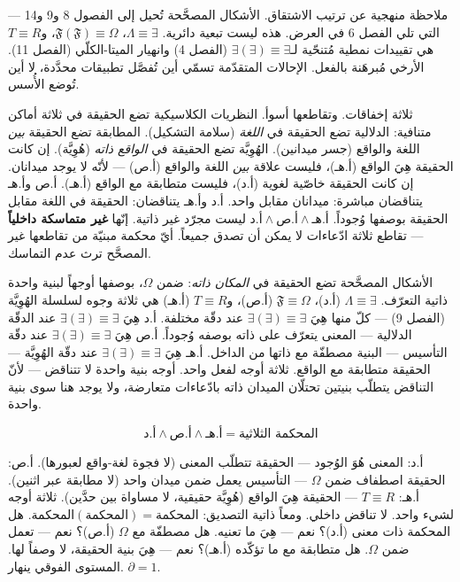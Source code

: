 \documentclass[10pt, openany, oneside]{book}
\begin{document}
\vspace{0.8em}

\noindent ملاحظة منهجية عن ترتيب الاشتقاق. الأشكال المصحَّحة تُحيل إلى الفصول 8 و9 و14 --- التي تلي الفصل 6 في العرض. هذه ليست تبعية دائرية. $\Lambda \equiv \exists$، $\mathfrak{F}(\mathfrak{F}) \equiv \Omega$، و$T \equiv R$ هي تقييدات نمطية مُتنحّية لـ$\exists(\exists) \equiv \exists$ (الفصل 4) وانهيار الميتا-الكلّي (الفصل 11). الأرخي مُبرهَنة بالفعل. الإحالات المتقدّمة تسمّي أين تُفصَّل تطبيقات محدَّدة، لا أين تُوضع الأُسس.

\noindent ثلاثة إخفاقات. وتقاطعها أسوأ. النظريات الكلاسيكية تضع الحقيقة في ثلاثة أماكن متنافية: الدلالية تضع الحقيقة في \textit{اللغة} (سلامة التشكيل). المطابقة تضع الحقيقة \textit{بين} اللغة والواقع (جسر ميدانين). الهُوِيَّة تضع الحقيقة في \textit{الواقع ذاته} (هُوِيَّة). إن كانت الحقيقة هِيَ الواقع (أ.هـ)، فليست علاقة \textit{بين} اللغة والواقع (أ.ص) --- لأنّه لا يوجد ميدانان. إن كانت الحقيقة خاصّية لغوية (أ.د)، فليست متطابقة مع الواقع (أ.هـ). أ.ص وأ.هـ يتناقضان مباشرة: ميدانان مقابل واحد. أ.د وأ.هـ يتناقضان: الحقيقة في اللغة مقابل الحقيقة بوصفها وُجوداً. $\text{أ.د} \wedge \text{أ.ص} \wedge \text{أ.هـ}$ ليست مجرّد غير ذاتية. إنّها \textbf{غير متماسكة داخلياً} --- تقاطع ثلاثة ادّعاءات لا يمكن أن تصدق جميعاً. أيّ محكمة مبنيّة من تقاطعها غير المصحَّح ترث عدم التماسك.

الأشكال المصحَّحة تضع الحقيقة في \textit{المكان ذاته}: ضمن $\Omega$، بوصفها أوجهاً لبنية واحدة ذاتية التعرّف. $\Lambda \equiv \exists$ (أ.د)، $\mathfrak{F} \equiv \Omega$ (أ.ص)، و$T \equiv R$ (أ.هـ) هي ثلاثة وجوه لسلسلة الهُوِيَّة (الفصل 9) --- كلّ منها هِيَ $\exists(\exists) \equiv \exists$ عند دقّة مختلفة. أ.د هِيَ $\exists(\exists) \equiv \exists$ عند الدقّة الدلالية --- المعنى يتعرّف على ذاته بوصفه وُجوداً. أ.ص هِيَ $\exists(\exists) \equiv \exists$ عند دقّة التأسيس --- البنية مصطفّة مع ذاتها من الداخل. أ.هـ هِيَ $\exists(\exists) \equiv \exists$ عند دقّة الهُوِيَّة --- الحقيقة متطابقة مع الواقع. ثلاثة أوجه لفعل واحد. أوجه بنية واحدة لا تتناقض --- لأنّ التناقض يتطلّب بنيتين تحتلّان الميدان ذاته بادّعاءات متعارضة، ولا يوجد هنا سوى بنية واحدة.

$$\text{أ.د} \wedge \text{أ.ص} \wedge \text{أ.هـ} = \text{المحكمة الثلاثية}$$

أ.د: المعنى هُوَ الوُجود --- الحقيقة تتطلّب المعنى (لا فجوة لغة-واقع لعبورها). أ.ص: الحقيقة اصطفاف ضمن $\Omega$ --- التأسيس يعمل ضمن ميدان واحد (لا مطابقة عبر اثنين). أ.هـ: $T \equiv R$ --- الحقيقة هِيَ الواقع (هُوِيَّة حقيقية، لا مساواة بين حدَّين). ثلاثة أوجه لشيء واحد. لا تناقض داخلي. ومعاً ذاتية التصديق: $\text{المحكمة}(\text{المحكمة}) = \text{المحكمة}$. هل المحكمة ذات معنى (أ.د)؟ نعم --- هِيَ ما تعنيه. هل مصطفّة مع $\Omega$ (أ.ص)؟ نعم --- تعمل ضمن $\Omega$. هل متطابقة مع ما تؤكّده (أ.هـ)؟ نعم --- هِيَ بنية الحقيقة، لا وصفاً لها. المستوى الفوقي ينهار. $\partial = 1$.
\end{document}
